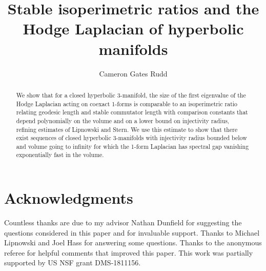 \documentclass[10pt]{article}
\title{Stable isoperimetric ratios and the Hodge Laplacian of hyperbolic manifolds}
\author{Cameron Gates Rudd}
\date{}
\theoremstyle{plain}
\begin{document}
\maketitle
\begin{abstract}
    We show that for a closed hyperbolic 3-manifold, the size of the first eigenvalue of the Hodge Laplacian acting on coexact 1-forms is comparable to an isoperimetric ratio relating geodesic length and stable commutator length with comparison constants that depend polynomially on the volume and on a lower bound on injectivity radius, refining estimates of Lipnowski and Stern. We use this estimate to show that there exist sequences of closed hyperbolic 3-manifolds with injectivity radius bounded below and volume going to infinity for which the 1-form Laplacian has spectral gap vanishing exponentially fast in the volume.
 \end{abstract}


\section*{Acknowledgments}  Countless thanks are due to my advisor Nathan Dunfield for suggesting the questions considered in this paper and for invaluable support. Thanks to Michael Lipnowski and Joel Hass for answering some questions. Thanks to the anonymous referee for helpful comments that improved this paper. This work was partially supported by US NSF grant DMS-1811156.







%



\end{document}
